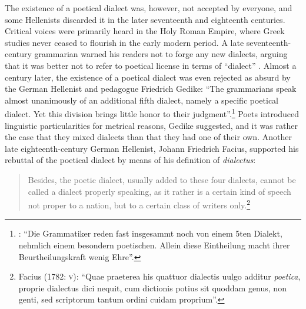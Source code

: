 \documentclass[output=paper]{langsci/langscibook}
\begin{document}
The existence of a poetical dialect was, however, not accepted by everyone, and some Hellenists discarded it in the later seventeenth and eighteenth centuries. Critical voices were primarily heard in the Holy Roman Empire, where Greek studies never ceased to flourish in the early modern period. A late seventeenth-century grammarian warned his readers not to forge any new dialects, arguing that it was better not to refer to poetical license in terms of “dialect” \citep[512]{Ursin1691}. Almost a century later, the existence of a poetical dialect was even rejected as absurd by the German Hellenist and pedagogue Friedrich Gedike: “The grammarians speak almost unanimously of an additional fifth dialect, namely a specific poetical dialect. Yet this division brings little honor to their judgment”.\footnote{\citet[21]{Gedike1782}: “Die Grammatiker reden fast insgesammt noch von einem 5ten Dialekt, nehmlich einem besondern poetischen. Allein diese Eintheilung macht ihrer Beurtheilungskraft wenig Ehre”.} Poets introduced linguistic particularities for metrical reasons, Gedike suggested, and it was rather the case that they mixed dialects than that they had one of their own. Another late eighteenth-century German Hellenist, Johann Friedrich Facius, supported his rebuttal of the poetical dialect by means of his definition of \textit{dialectus}:

\begin{quote}
Besides, the poetic dialect, usually added to these four dialects, cannot be called a dialect properly speaking, as it rather is a certain kind of speech not proper to a nation, but to a certain class of writers only.\footnote{Facius (1782: \textsc{v}): “Quae praeterea his quattuor dialectis uulgo additur \textit{poetica}, proprie dialectus dici nequit, cum dictionis potius sit quoddam genus, non genti, sed scriptorum tantum ordini cuidam proprium”.}
\end{quote}
\end{document}
